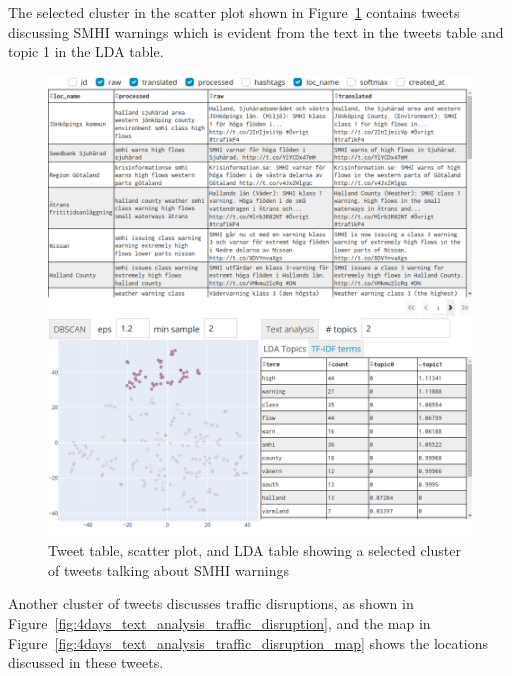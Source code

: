 The selected cluster in the scatter plot shown in Figure~\ref{fig:4days_text_analysis} contains tweets discussing \ac{SMHI}
warnings which is evident from the text in the tweets table and topic 1 in the \ac{LDA} table. 

\begin{figure}[H]
  \begin{center}
    \includegraphics[width=\columnwidth]{./images/4days_text_analysis.png}
  \end{center}
  \caption{Tweet table, scatter plot, and LDA table showing a selected cluster of tweets
  talking about SMHI warnings}
  \label{fig:4days_text_analysis}
\end{figure}

Another cluster of tweets discusses traffic disruptions, as shown in Figure~\ref{fig:4days_text_analysis_traffic_disruption}, and the map in
Figure~\ref{fig:4days_text_analysis_traffic_disruption_map} shows the locations discussed in these tweets.

